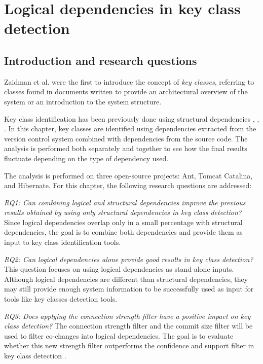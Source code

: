 \chapter{Logical dependencies in key class detection}
\label{cap:key_class_detection}

\section{Introduction and research questions}
\label{sec:key_introduction}
\hspace{4em}Zaidman et al. \cite{ZaidmanJurnal} were the first to introduce the concept of \emph{key classes}, referring to classes found in documents written to provide an architectural overview of the system or an introduction to the system structure.

Key class identification has been previously done using structural dependencies \cite{PagerankENASE}, \cite{enase15}, \cite{PagerankSACI}. In this chapter, key classes are identified using dependencies extracted from the version control system combined with dependencies from the source code. The analysis is performed both separately and together to see how the final results fluctuate depending on the type of dependency used.

The analysis is performed on three open-source projects: Ant, Tomcat Catalina, and Hibernate. For this chapter, the following research questions are addressed:

\emph{RQ1: Can combining logical and structural dependencies improve the previous results obtained by using only structural dependencies in key class detection?}  
Since logical dependencies overlap only in a small percentage with structural dependencies, the goal is to combine both dependencies and provide them as input to key class identification tools.

\emph{RQ2: Can logical dependencies alone provide good results in key class detection?}  
This question focuses on using logical dependencies as stand-alone inputs. Although logical dependencies are different than structural dependencies, they may still provide enough system information to be successfully used as input for tools like key classes detection tools.

\emph{RQ3: Does applying the connection strength filter have a positive impact on key class detection?}  
The connection strength filter and the commit size filter will be used to filter co-changes into logical dependencies. The goal is to evaluate whether this new strength filter outperforms the confidence and support filter in key class detection \cite{b4}.


